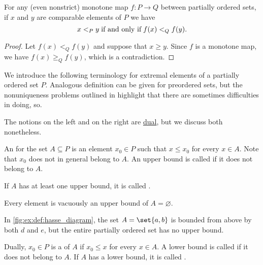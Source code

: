 \begin{proposition}\label{thm:monotone_map_converse}
  For any (even nonstrict) monotone map \( f: P \to Q \) between partially ordered sets, if \( x \) and \( y \) are comparable elements of \( P \) we have
  \begin{equation}\label{eq:thm:monotone_map_converse}
    x <_P y \T{if and only if} f(x) <_Q f(y).
  \end{equation}
\end{proposition}
\begin{proof}
  Let \( f(x) <_Q f(y) \) and suppose that \( x \geq y \). Since \( f \) is a monotone map, we have \( f(x) \geq_Q f(y) \), which is a contradiction.
\end{proof}

\begin{definition}\label{def:partially_ordered_set_extremal_points}
  We introduce the following terminology for extremal elements of a partially ordered set \( P \). Analogous definition can be given for preordered sets, but the nonuniqueness problems outlined in  highlight that there are sometimes difficulties in doing, so.

  The notions on the left and on the right are \hyperref[def:partially_ordered_set/opposite]{dual}, but we discuss both nonetheless.

  \begin{thmenum}
    \begin{minipage}[t]{0.45\textwidth}
      An  for the set \( A \subseteq P \) is an element \( x_0 \in P \) such that \( x \leq x_0 \) for every \( x \in A \). Note that \( x_0 \) does not in general belong to \( A \). An upper bound is called  if it does not belong to \( A \).

      If \( A \) has at least one upper bound, it is called .

      Every element is vacuously an upper bound of \( A = \varnothing \).

      In \cref{fig:ex:def:hasse_diagram}, the set \( A = \set{ a, b } \) is bounded from above by both \( d \) and \( e \), but the entire partially ordered set has no upper bound.
    \end{minipage}
    \hspace{0.02\textwidth}
    \begin{minipage}[t]{0.45\textwidth}
      Dually, \( x_0 \in P \) is a  of \( A \) if \( x_0 \leq x \) for every \( x \in A \). A lower bound is called  if it does not belong to \( A \). If \( A \) has a lower bound, it is called .


\end{minipage}
\end{thmenum}
\end{definition}
